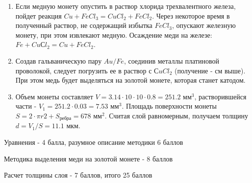 \solutionSection

\begin{enumerate}
    \item Если медную монету опустить в раствор хлорида трехвалентного железа, пойдет реакция $Cu + FeCl_3 = CuCl_2 + FeCl_2$. 
    Через некоторое время в полученный раствор, не содержащий избытка $FeCl_3$, опускают железную монету, при 
    этом извлекают медную. Осаждение меди на железе: $Fe + CuСl_2 = Cu + FeCl_2$.
    \item Создав гальваническую пару $Au/Fe$, соединив металлы платиновой проволокой, следует погрузить ее в 
    раствор с $СuCl_2$ (получение - см выше). При этом медь будет выделяться на золотой монете, которая станет катодом.
    \item Объем монеты составляет $V = 3.14 \cdot 10 \cdot 10 \cdot 0.8 = 251.2$ мм$^3$, растворившейся части - 
    $V_1 = 251.2 \cdot 0.03 = 7.53$ мм$^3$. Площадь поверхности монеты $S = 2 \cdot \pi r2 + S_{\text{ребра}}= 678$ мм$^2$. 
    Считая слой равномерным, получаем толщину $d = V_1/S = 11.1$ мкм.
\end{enumerate}

Уравнения - 4 балла, разумное описание методики 6 баллов

Методика выделения меди на золотой монете - 8 баллов

Расчет толщины слоя - 7 баллов, итого 25 баллов